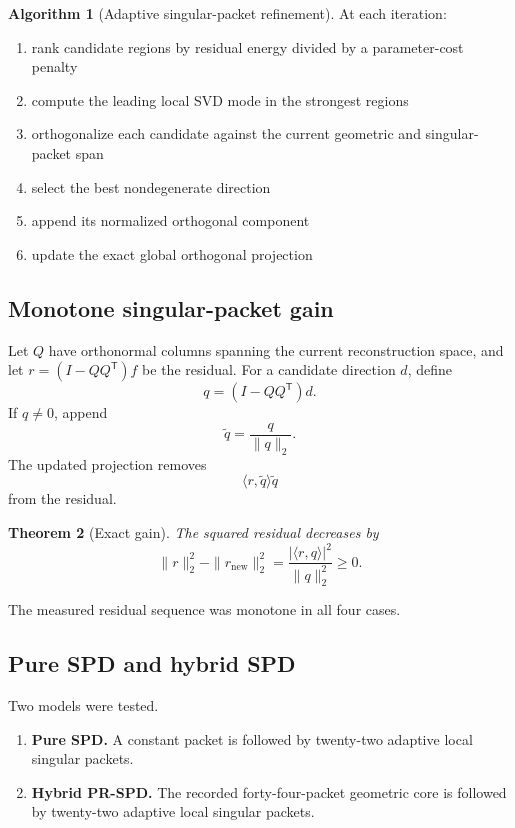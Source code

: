 \documentclass[11pt]{article}
\newtheorem{theorem}{Theorem}[section]
\theoremstyle{definition}
\newtheorem{algorithm}[theorem]{Algorithm}
\theoremstyle{remark}
\begin{document}
\begin{algorithm}[Adaptive singular-packet refinement]
At each iteration:
\begin{enumerate}
\item rank candidate regions by residual energy divided by a parameter-cost penalty
\item compute the leading local SVD mode in the strongest regions
\item orthogonalize each candidate against the current geometric and singular-packet span
\item select the best nondegenerate direction
\item append its normalized orthogonal component
\item update the exact global orthogonal projection
\end{enumerate}
\end{algorithm}

\FloatBarrier
\subsection{Monotone singular-packet gain}
Let $Q$ have orthonormal columns spanning the current reconstruction space, and let $r=(I-QQ^{\mathsf T})f$ be the residual. For a candidate direction $d$, define
\[
q=(I-QQ^{\mathsf T})d.
\]
If $q\ne0$, append
\[
\widetilde q=\frac q{\|q\|_2}.
\]
The updated projection removes
\[
\langle r,\widetilde q\rangle\widetilde q
\]
from the residual.

\begin{theorem}[Exact gain]
The squared residual decreases by
\[
\boxed{
\|r\|_2^2-\|r_{\mathrm{new}}\|_2^2
=
\frac{|\langle r,q\rangle|^2}{\|q\|_2^2}
\ge0.
}
\]
\end{theorem}

The measured residual sequence was monotone in all four cases.

\FloatBarrier
\subsection{Pure SPD and hybrid SPD}
Two models were tested.

\begin{enumerate}
\item \textbf{Pure SPD.} A constant packet is followed by twenty-two adaptive local singular packets.
\item \textbf{Hybrid PR-SPD.} The recorded forty-four-packet geometric core is followed by twenty-two adaptive local singular packets.
\end{enumerate}
\end{document}
